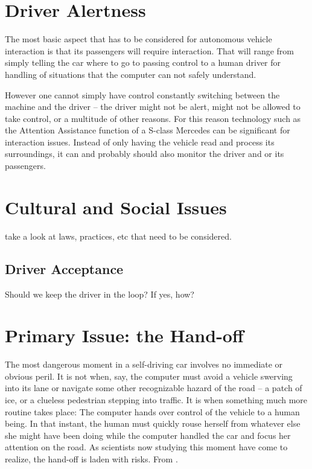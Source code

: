 \documentclass{acm_proc_article-sp}
\begin{document}
\section{Driver Alertness}

The most basic aspect that has to be considered for autonomous vehicle interaction is that its passengers will require interaction.
That will range from simply telling the car where to go to passing control to a human driver for handling of situations that the computer can not safely understand.

However one cannot simply have control constantly switching between the machine and the driver – the driver might not be alert, might not be allowed to take control, or a multitude of other reasons.
For this reason technology such as the Attention Assistance function of a S-class Mercedes can be significant for interaction issues.
Instead of only having the vehicle read and process its surroundings, it can and probably should also monitor the driver and or its passengers.

\section{Cultural and Social Issues}

take a look at laws, practices, etc that need to be considered.

\subsection{Driver Acceptance}

Should we keep the driver in the loop?
If yes, how?

\section{Primary Issue: the Hand-off}

The most dangerous moment in a self-driving car involves no immediate or obvious peril.
It is not when, say, the computer must avoid a vehicle swerving into its lane or navigate some other recognizable hazard of the road -- a patch of ice, or a clueless pedestrian stepping into traffic.
It is when something much more routine takes place: The computer hands over control of the vehicle to a human being.
In that instant, the human must quickly rouse herself from whatever else she might have been doing while the computer handled the car and focus her attention on the road.
As scientists now studying this moment have come to realize, the hand-off is laden with risks.
From \cite{www:huffington_post}.
\end{document}
